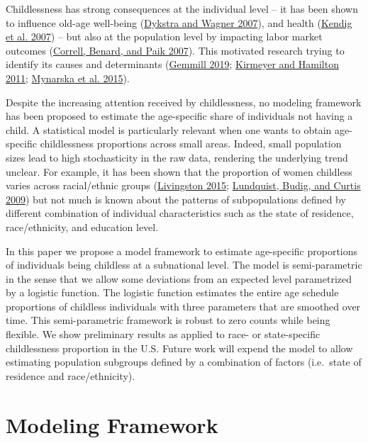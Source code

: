 \documentclass[
  11pt,
  letterpaper,
]{article}
\begin{document}
Childlessness has strong consequences at the individual level -- it has been shown to influence old-age well-being (\protect\hyperlink{ref-dykstra2007pathways}{Dykstra and Wagner 2007}), and health (\protect\hyperlink{ref-kendig2007health}{Kendig et al. 2007}) -- but also at the population level by impacting labor market outcomes (\protect\hyperlink{ref-correll2007getting}{Correll, Benard, and Paik 2007}). This motivated research trying to identify its causes and determinants (\protect\hyperlink{ref-gemmill2019some}{Gemmill 2019}; \protect\hyperlink{ref-kirmeyer2011childbearing}{Kirmeyer and Hamilton 2011}; \protect\hyperlink{ref-mynarska2015diverse}{Mynarska et al. 2015}).

Despite the increasing attention received by childlessness, no modeling framework has been proposed to estimate the age-specific share of individuals not having a child. A statistical model is particularly relevant when one wants to obtain age-specific childlessness proportions across small areas. Indeed, small population sizes lead to high stochasticity in the raw data, rendering the underlying trend unclear. For example, it has been shown that the proportion of women childless varies across racial/ethnic groups (\protect\hyperlink{ref-livingston2015childlessness}{Livingston 2015}; \protect\hyperlink{ref-lundquist2009race}{Lundquist, Budig, and Curtis 2009}) but not much is known about the patterns of subpopulations defined by different combination of individual characteristics such as the state of residence, race/ethnicity, and education level.

In this paper we propose a model framework to estimate age-specific proportions of individuals being childless at a subnational level. The model is semi-parametric in the sense that we allow some deviations from an expected level parametrized by a logistic function. The logistic function estimates the entire age schedule proportions of childless individuals with three parameters that are smoothed over time. This semi-parametric framework is robust to zero counts while being flexible. We show preliminary results as applied to race- or state-specific childlessness proportion in the U.S. Future work will expend the model to allow estimating population subgroups defined by a combination of factors (i.e.~state of residence and race/ethnicity).

\hypertarget{modeling-framework}{%
\section{Modeling Framework}\label{modeling-framework}}
\end{document}
